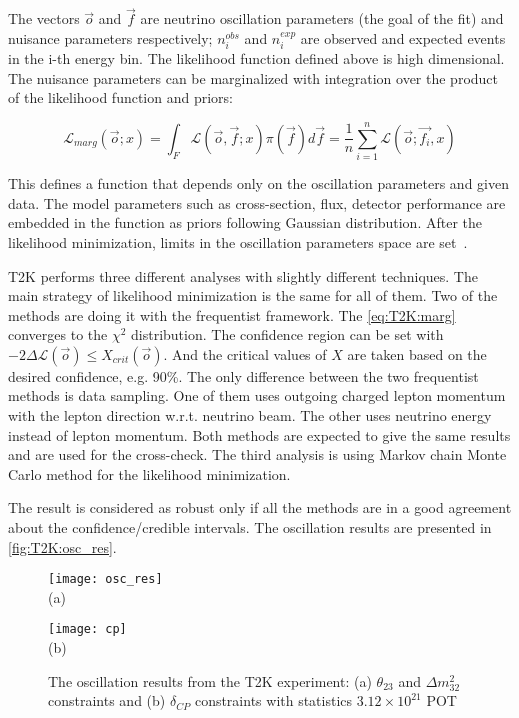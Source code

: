 \documentclass[../main.tex]{subfiles}
\begin{document}
The vectors $\overrightarrow{o}$ and $\overrightarrow{f}$ are neutrino oscillation parameters (the goal of the fit) and nuisance parameters respectively; $n_i^{obs}$ and $n_i^{exp}$ are observed and expected events in the i-th energy bin. The likelihood function defined above is high dimensional. The nuisance parameters can be marginalized with integration over the product of the likelihood function and priors:

\begin{equation}
\mathcal{L}_{marg}\left(\overrightarrow{o}; x\right)=\int_F\mathcal{L}\left(\overrightarrow{o},\overrightarrow{f};x\right)\pi(\overrightarrow{f})d\overrightarrow{f}=\frac{1}{n}\sum_{i=1}^{n}\mathcal{L}\left(\overrightarrow{o}; \overrightarrow{f_i}, x\right)
\label{eq:T2K:marg}
\end{equation}

This defines a function that depends only on the oscillation parameters and given data. The model parameters such as cross-section, flux, detector performance are embedded in the function as priors following Gaussian distribution. After the likelihood minimization, limits in the oscillation parameters space are set~\cite{Cousins1992}.

T2K performs three different analyses with slightly different techniques. The main strategy of likelihood minimization is the same for all of them. Two of the methods are doing it with the frequentist framework. The \autoref{eq:T2K:marg} converges to the $\chi^2$ distribution. The confidence region can be set with $-2\Delta\mathcal{L}(\overrightarrow{o})\leqslant X_{crit}(\overrightarrow{o})$. And the critical values of $X$ are taken based on the desired confidence, e.g. 90\%. The only difference between the two frequentist methods is data sampling. One of them uses outgoing charged lepton momentum with the lepton direction w.r.t. neutrino beam. The other uses neutrino energy instead of lepton momentum. Both methods are expected to give the same results and are used for the cross-check. The third analysis is using Markov chain Monte Carlo method for the likelihood minimization.

The result is considered as robust only if all the methods are in a good agreement about the confidence/credible intervals. The oscillation results are presented in \autoref{fig:T2K:osc_res}.

\begin{figure}[!ht]
  \centering
  \begin{minipage}{0.49\linewidth}
    \centering
    \texttt{[image: osc\_res]} \\ (a)
  \end{minipage}
  \begin{minipage}{0.49\linewidth}
    \centering
    \texttt{[image: cp]} \\ (b)
  \end{minipage}
    \caption{The oscillation results from the T2K experiment: (a) $\theta_{23}$ and $\Delta m_{32}^2$ constraints and (b) $\delta_{CP}$ constraints with statistics $3.12\times10^21$ POT}
    \label{fig:T2K:osc_res}
\end{figure}
\end{document}
